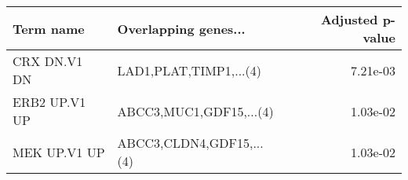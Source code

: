 \begin{tabular}{llr}
\toprule
    Term name &     Overlapping genes... &  Adjusted p-value \\
\midrule
 CRX DN.V1 DN &   LAD1,PLAT,TIMP1,...(4) &          7.21e-03 \\
ERB2 UP.V1 UP &  ABCC3,MUC1,GDF15,...(4) &          1.03e-02 \\
 MEK UP.V1 UP & ABCC3,CLDN4,GDF15,...(4) &          1.03e-02 \\
\bottomrule
\end{tabular}
